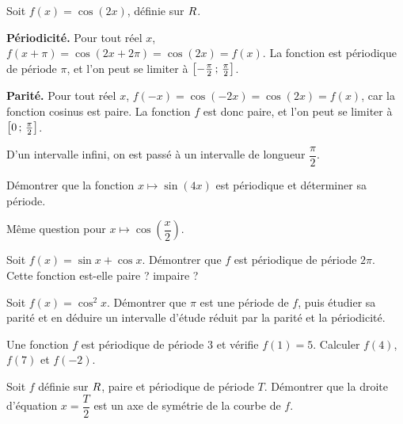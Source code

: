 \begin{exemple}
Soit $f(x) = \cos(2x)$, définie sur $R$.

\textbf{Périodicité.} Pour tout réel $x$, $f(x + \pi) = \cos(2x + 2\pi)
= \cos(2x) = f(x)$. La fonction est périodique de période $\pi$, et l'on
peut se limiter à $\left[-\frac{\pi}{2}\,;\,\frac{\pi}{2}\right]$.

\textbf{Parité.} Pour tout réel $x$, $f(-x) = \cos(-2x) = \cos(2x) = f(x)$,
car la fonction cosinus est paire. La fonction $f$ est donc paire, et l'on
peut se limiter à $\left[0\,;\,\frac{\pi}{2}\right]$.

D'un intervalle infini, on est passé à un intervalle de longueur
$\dfrac{\pi}{2}$.
\end{exemple}

\begin{entrainement}
\exo\label{t11s-c01-e24} Démontrer que la fonction $x \mapsto \sin(4x)$ est périodique et
déterminer sa période.

\exo\label{t11s-c01-e25} Même question pour $x \mapsto \cos\!\left(\dfrac{x}{2}\right)$.

\exo\label{t11s-c01-e26} Soit $f(x) = \sin x + \cos x$. Démontrer que $f$ est périodique de
période $2\pi$. Cette fonction est-elle paire ? impaire ?

\exo\label{t11s-c01-e27} Soit $f(x) = \cos^{2} x$. Démontrer que $\pi$ est une période de $f$,
puis étudier sa parité et en déduire un intervalle d'étude réduit par la parité et la périodicité.

\exo\label{t11s-c01-e28} Une fonction $f$ est périodique de période $3$ et vérifie $f(1) = 5$.
Calculer $f(4)$, $f(7)$ et $f(-2)$.

\exo\label{t11s-c01-e29} Soit $f$ définie sur $R$, paire et périodique de période $T$.
Démontrer que la droite d'équation $x = \dfrac{T}{2}$ est un axe de symétrie
de la courbe de $f$.
\end{entrainement}


